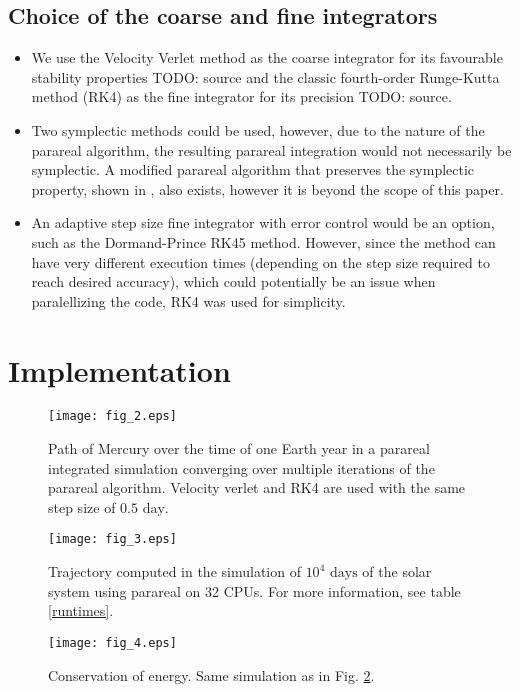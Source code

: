\documentclass[conference]{IEEEtran}
\begin{document}
\subsection{Choice of the coarse and fine integrators}
\begin{itemize}
    \item We use the Velocity Verlet method as the coarse integrator for its favourable stability properties {\color{red} TODO: source} and the classic fourth-order Runge-Kutta method (RK4) as the fine integrator for its precision {\color{red} TODO: source}. 
    \item Two symplectic methods could be used, however, due to the nature of the parareal algorithm, the resulting parareal integration would not necessarily be symplectic. A modified parareal algorithm that preserves the symplectic property, shown in \cite{symplecticparareal}, also exists, however it is beyond the scope of this paper.
    \item An adaptive step size fine integrator with error control would be an option, such as the Dormand-Prince RK45 method. However, since the method can have very different execution times (depending on the step size required to reach desired accuracy), which could potentially be an issue when paralellizing the code, RK4 was used for simplicity.
\end{itemize}

\section{Implementation}

\begin{figure}[htbp]
\centerline{\texttt{[image: fig\_2.eps]}}
\caption{Path of Mercury over the time of one Earth year in a parareal integrated simulation converging over multiple iterations of the parareal algorithm. Velocity verlet and RK4 are used with the same step size of $0.5\text{ day}$.}
\label{mercury}
\end{figure}

\begin{figure}[htbp]
\centerline{\texttt{[image: fig\_3.eps]}}
\caption{Trajectory computed in the simulation of $10^4\text{ days}$ of the solar system using parareal on 32 CPUs. For more information, see table \ref{runtimes}.}
\label{sim}
\end{figure}

\begin{figure}[htbp]
\centerline{\texttt{[image: fig\_4.eps]}}
\caption{Conservation of energy. Same simulation as in Fig. \ref{sim}.}
\label{energy}
\end{figure}
\end{document}
